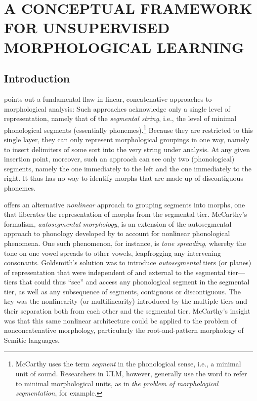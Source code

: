 \chapter{A CONCEPTUAL FRAMEWORK FOR UNSUPERVISED MORPHOLOGICAL LEARNING}
\label{ch:lit-review}

\section{Introduction}
\label{sec:framework-intro}
\cite{mccarthy:1981} points out a fundamental flaw in linear, 
concatenative approaches to morphological analysis: 
Such approaches acknowledge only a single level of representation, 
namely that of the \emph{segmental string}, i.e., the level of minimal 
phonological segments (essentially phonemes).\footnote{McCarthy uses
 the term \emph{segment} in the phonological sense, i.e., a minimal unit of sound. 
Researchers in \ac{ULM}, however, generally use the word to 
refer to minimal morphological units, 
as in \textit{the problem of morphological segmentation}, for example.}
Because they are restricted to this single layer, they can only represent 
morphological groupings in one way, namely to insert delimiters of 
some sort 
into the very string under analysis. At any given
insertion point, moreover, such an approach can see only two (phonological) segments, namely the one immediately to the left and the one immediately to the right.
It thus
has no way to identify morphs that are made up of discontiguous phonemes.

\cite{mccarthy:1981} offers an alternative \emph{nonlinear} 
approach to grouping segments into morphs, one that liberates the 
representation of morphs from the segmental tier. McCarthy's formalism, 
\emph{autosegmental morphology}, is an extension of the autosegmental 
approach to phonology developed by \citet{goldsmith:1976} to account 
for nonlinear phonological phenomena. One such phenomenon, for instance, 
is \emph{tone spreading}, whereby the tone on one vowel spreads to other 
vowels, leapfrogging any intervening consonants. 
Goldsmith's solution was to introduce \emph{autosegmental} tiers 
(or planes) of representation that were independent of and external 
to the segmental tier---tiers that could thus ``see'' and access any 
phonological segment in the segmental tier, as well as any subsequence 
of segments, contiguous or discontiguous. The key was the nonlinearity 
(or multilinearity)
introduced by the multiple tiers and their separation both from each other 
and the segmental tier. 
McCarthy's insight was that this same nonlinear architecture could be 
applied to the problem of nonconcatenative morphology, particularly the 
root-and-pattern morphology of Semitic languages. 

